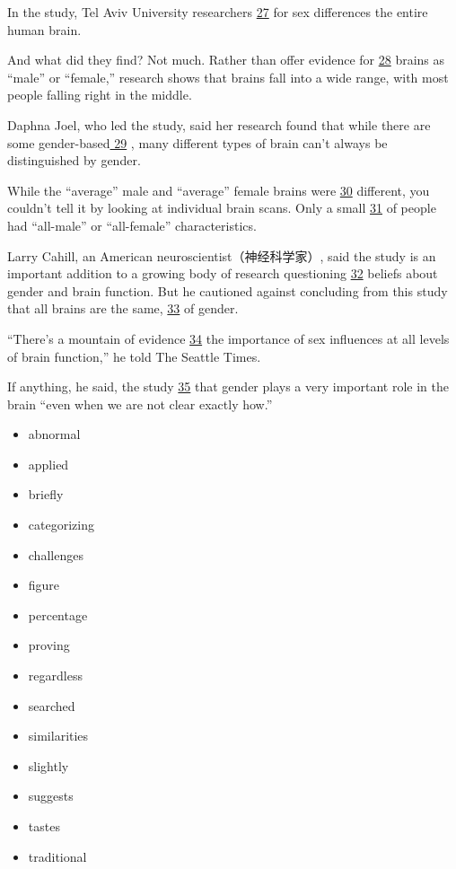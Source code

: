 \documentclass[UTF8,11pt]{ctexart}
\begin{document}
In the study, Tel Aviv University researchers \uline{27} for sex differences the entire human brain.


And what did they find? Not much. Rather than offer evidence for \uline{28} brains as “male” or “female,” research shows that brains fall into a wide range, with most people falling right in the middle.


Daphna Joel, who led the study, said her research found that while there are some gender-based\uline{ 29} , many different types of brain can't always be distinguished by gender.


While the “average” male and “average” female brains were \uline{30} different, you couldn't tell it by looking at individual brain scans. Only a small \uline{31} of people had “all-male” or “all-female” characteristics.


Larry Cahill, an American neuroscientist（神经科学家）, said the study is an important addition to a growing body of research questioning \uline{32} beliefs about gender and brain function. But he cautioned against concluding from this study that all brains are the same, \uline{33} of gender.


“There's a mountain of evidence \uline{34} the importance of sex influences at all levels of brain function,” he told The Seattle Times.


If anything, he said, the study \uline{35} that gender plays a very important role in the brain “even when we are not clear exactly how.”


\begin{itemize}[leftmargin=2em,itemsep=.2em,topsep=.4em]\item[A.] abnormal
\item[B.] applied
\item[C.] briefly
\item[D.] categorizing
\item[E.] challenges
\item[F.] figure
\item[G.] percentage
\item[H.] proving
\item[I.] regardless
\item[J.] searched
\item[K.] similarities
\item[L.] slightly
\item[M.] suggests
\item[N.] tastes
\item[O.] traditional
\end{itemize}
\end{document}
